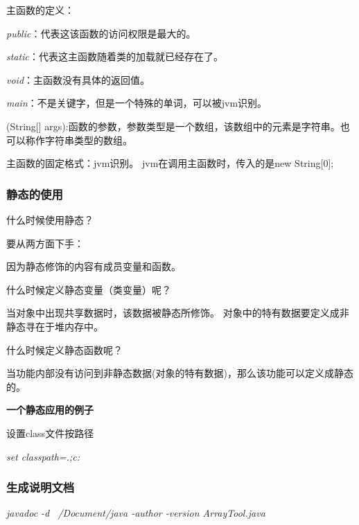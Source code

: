 \documentclass[UTF8]{ctexart}
\begin{document}
主函数的定义：

\textit{public}：代表这该函数的访问权限是最大的。

\textit{static}：代表这主函数随着类的加载就已经存在了。

\textit{void}：主函数没有具体的返回值。

\textit{main}：不是关键字，但是一个特殊的单词，可以被jvm识别。

(String[] args):函数的参数，参数类型是一个数组，该数组中的元素是字符串。也可以称作字符串类型的数组。

主函数的固定格式：jvm识别。
jvm在调用主函数时，传入的是new String[0];

\subsubsection{静态的使用}
什么时候使用静态？

要从两方面下手：

因为静态修饰的内容有成员变量和函数。

什么时候定义静态变量（类变量）呢？

当对象中出现共享数据时，该数据被静态所修饰。
对象中的特有数据要定义成非静态寻在于堆内存中。

什么时候定义静态函数呢？

当功能内部没有访问到非静态数据(对象的特有数据)，那么该功能可以定义成静态的。

\textbf{一个静态应用的例子}



设置class文件按路径

\textit{set classpath=.;c:\myclass}
\subsubsection{生成说明文档}

\textit{javadoc -d ~/Document/java -author -version ArrayTool.java}
\end{document}
